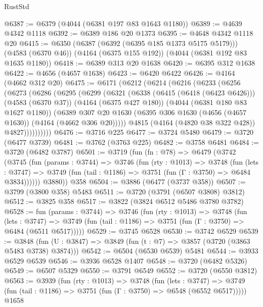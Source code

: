 \begin{lexlean}{RustStd}
\begin{coremodule}
@6387 := @6379 (@4044 (@6381 @197 @83 @1643 @1180))
@6389 := @4639 @4342 @1118
@6392 := @6389 @186 @20 @1373
@6395 := @4648 @4342 @1118 @20
@6415 := @6350
    (@6387 (@6392 (@6395 @185 @1373 @5175 @5179)))
    (@4583 (@6370 @46))
    (@4164 (@6375 @155 @192))
    (@4044 (@6381 @192 @83 @1635 @1180))
@6418 := @6389 @313 @20 @1638
@6420 := @6395 @312 @1638
@6422 := @4656 (@4657 @1638)
@6423 := @6420 @6422
@6426 := @4164 (@4662 @312 @20)
@6475 := @6171
    (@6212
      (@6214
        (@6216
          (@6233
            (@6256
              (@6273
                (@6286
                  (@6295
                    (@6299
                      (@6321
                        (@6338
                          (@6415 (@6418 (@6423 @6426)))
                          (@4583 (@6370 @37))
                          (@4164 (@6375 @427 @180))
                          (@4044 (@6381 @180 @83 @1627 @1180))
                          (@6389
                            @307
                            @20
                            @1630
                            (@6395 @306 @1630 (@4656 (@4657 @1630)) (@4164 (@4662 @306 @20)))))
                        @4815
                        (@4164 (@4820 @38 @322 @428))
                        @4827))))))))))
@6476 := @3716 @225
@6477 := @3724 @5480
@6479 := @3720 (@6477 @3739)
@6481 := @3762 (@3763 @225)
@6482 := @3758 @6481
@6484 := @3720 (@6482 @3787)
@6501 := @3719
    (fun (fn : @78) =>
    @6479
      (@3742
        (@3745
          (fun (params : @3744) =>
          @3746
            (fun (rty : @1013) =>
            @3748
              (fun (lets : @3747) =>
              @3749 (fun (tail : @1186) => @3751 (fun (Γ : @3750) => @6484 @3834))))))
        @3880))
    @358
@6504 := @3886 (@6477 (@3737 @358))
@6507 := @3799 (@3800 @358) @5483
@6511 := @3720 (@3791 (@6507 @3808) @3812)
@6512 := @3825 @358
@6517 := @3822 (@3824 @6512 @5486 @3780 @3782)
@6528 := fun (params : @3744) =>
  @3746
    (fun (rty : @1013) =>
    @3748
      (fun (lets : @3747) =>
      @3749 (fun (tail : @1186) => @3751 (fun (Γ : @3750) => @6484 (@6511 @6517)))))
@6529 := @3745 @6528
@6530 := @3742 @6529
@6539 := @3848 (fun (U : @3847) => @3849 (fun (t : @7) => @3857 (@3720 (@3863 @5483 @3738) @3874)))
@6542 := @6504 (@6530 @6539) @5481
@6544 := @3933 @6529 @6539
@6546 := @3936 @6528 @1407
@6548 := @3720 (@6482 @5326)
@6549 := @6507 @5329
@6550 := @3791 @6549
@6552 := @3720 (@6550 @3812)
@6563 := @3939
    (fun (rty : @1013) =>
    @3748
      (fun (lets : @3747) =>
      @3749 (fun (tail : @1186) => @3751 (fun (Γ : @3750) => @6548 (@6552 @6517)))))
    @1658

\end{coremodule}
\end{lexlean}
